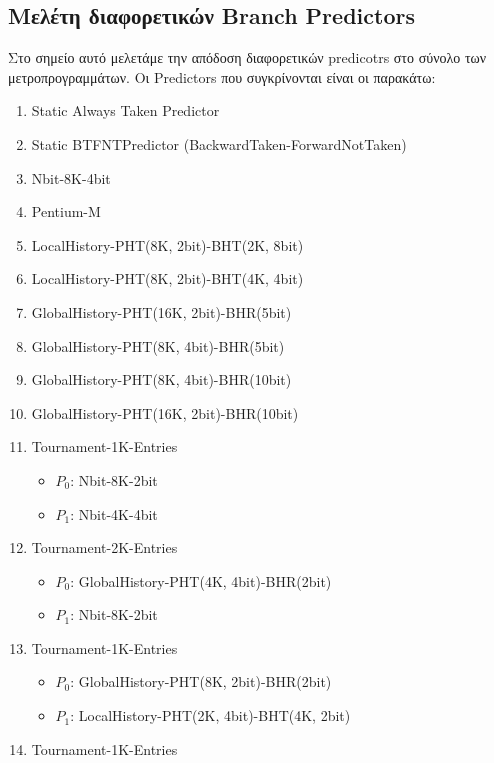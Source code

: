 \newpage
\subsection{Μελέτη διαφορετικών Branch Predictors}
\vspace{3mm}

Στο σημείο αυτό μελετάμε την απόδοση διαφορετικών predicotrs στο σύνολο των
μετροπρογραμμάτων. Οι Predictors που συγκρίνονται είναι οι παρακάτω:

\begin{flushleft}
\begin{enumerate}[font=\small]
   \item Static Always Taken Predictor
   \item Static BTFNTPredictor (BackwardTaken-ForwardNotTaken)
   \item Nbit-8K-4bit 
   \item Pentium-M
   \item LocalHistory-PHT(8K, 2bit)-BHT(2K, 8bit)
   \item LocalHistory-PHT(8K, 2bit)-BHT(4K, 4bit)
   \item GlobalHistory-PHT(16K, 2bit)-BHR(5bit)
   \item GlobalHistory-PHT(8K, 4bit)-BHR(5bit)
   \item GlobalHistory-PHT(8K, 4bit)-BHR(10bit)
   \item GlobalHistory-PHT(16K, 2bit)-BHR(10bit)
   \item Tournament-1K-Entries
      \begin{itemize}
         \item $P_0$: Nbit-8K-2bit
         \item $P_1$: Nbit-4K-4bit
      \end{itemize}
   \item Tournament-2K-Entries
      \begin{itemize}
         \item $P_0$: GlobalHistory-PHT(4K, 4bit)-BHR(2bit)
         \item $P_1$: Nbit-8K-2bit
      \end{itemize}
   \item Tournament-1K-Entries
      \begin{itemize}
         \item $P_0$: GlobalHistory-PHT(8K, 2bit)-BHR(2bit)
         \item $P_1$: LocalHistory-PHT(2K, 4bit)-BHT(4K, 2bit)
      \end{itemize}
   \item Tournament-1K-Entries

\end{enumerate}
\end{flushleft}
